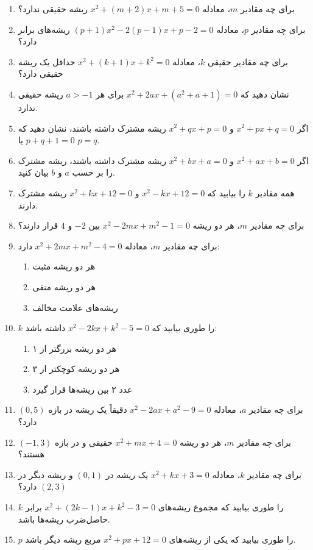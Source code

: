 \documentclass[12pt,a4paper]{article}
\begin{document}
\begin{enumerate}
\item برای چه مقادیر $m$، معادله $x^2 + (m+2)x + m + 5 = 0$ ریشه حقیقی ندارد؟
\item برای چه مقادیر $p$، معادله $(p+1)x^2 - 2(p-1)x + p - 2 = 0$ ریشه‌های برابر دارد؟
\item برای چه مقادیر حقیقی $k$، معادله $x^2 + (k+1)x + k^2 = 0$ حداقل یک ریشه حقیقی دارد؟
\item نشان دهید که $x^2 + 2ax + (a^2 + a + 1) = 0$ برای هر $a > -1$ ریشه حقیقی ندارد.
\item اگر $x^2 + px + q = 0$ و $x^2 + qx + p = 0$ ریشه مشترک داشته باشند، نشان دهید که $p + q + 1 = 0$ یا $p = q$.
\item اگر $x^2 + ax + b = 0$ و $x^2 + bx + a = 0$ ریشه مشترک داشته باشند، ریشه مشترک را بر حسب $a$ و $b$ بیان کنید.
\item همه مقادیر $k$ را بیابید که $x^2 - kx + 12 = 0$ و $x^2 + kx + 12 = 0$ ریشه مشترک دارند.
\item برای چه مقادیر $m$، هر دو ریشه $x^2 - 2mx + m^2 - 1 = 0$ بین $-2$ و $4$ قرار دارند؟
\item برای چه مقادیر $m$، معادله $x^2 + 2mx + m^2 - 4 = 0$ دارد:
  \begin{enumerate}[label=(\alph*)]
    \item هر دو ریشه مثبت
    \item هر دو ریشه منفی
    \item ریشه‌های علامت مخالف
  \end{enumerate}
\item $k$ را طوری بیابید که $x^2 - 2kx + k^2 - 5 = 0$ داشته باشد:
  \begin{enumerate}[label=(\alph*)]
    \item هر دو ریشه بزرگتر از ۱
    \item هر دو ریشه کوچکتر از ۳
    \item عدد ۲ بین ریشه‌ها قرار گیرد
  \end{enumerate}
\item برای چه مقادیر $a$، معادله $x^2 - 2ax + a^2 - 9 = 0$ دقیقاً یک ریشه در بازه $(0, 5)$ دارد؟
\item برای چه مقادیر $m$، هر دو ریشه $x^2 + mx + 4 = 0$ حقیقی و در بازه $(-1, 3)$ هستند؟
\item برای چه مقادیر $k$، معادله $x^2 + kx + 3 = 0$ یک ریشه در $(0, 1)$ و ریشه دیگر در $(2, 3)$ دارد؟
\item $k$ را طوری بیابید که مجموع ریشه‌های $x^2 + (2k-1)x + k^2 - 3 = 0$ برابر حاصل‌ضرب ریشه‌ها باشد.
\item $p$ را طوری بیابید که یکی از ریشه‌های $x^2 + px + 12 = 0$ مربع ریشه دیگر باشد.

\end{enumerate}
\end{document}
